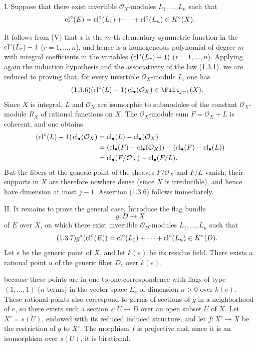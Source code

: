 I. Suppose that there exist invertible $\mathcal O_X$-modules
$L_1,\ldots,L_n$ such that
\[
\operatorname{cl}^\circ(E)=\operatorname{cl}^\circ(L_1)+\cdots+\operatorname{cl}^\circ(L_n)\in K^\circ(X).
\]

It follows from (V) that $x$ is the $m$-th elementary symmetric function in
the $\operatorname{cl}^\circ(L_r)-1$ ($r=1,\ldots,n$), and hence is a homogeneous
polynomial of degree $m$ with integral coefficients in the variables
$(\operatorname{cl}^\circ(L_r)-1)$ ($r=1,\ldots,n$). Applying again the induction
hypothesis and the associativity of the law (1.3.1), we are reduced to proving
that, for every invertible $\mathcal O_X$-module $L$, one has
\begin{equation}\tag{1.3.6}
(\cl^\circ(L)-1)\cl_\bullet(\mathcal O_X)\in\Filt_{j-1}(X).
\end{equation}
Since $X$ is integral, $L$ and $\mathcal O_X$ are isomorphic to submodules of
the constant $\mathcal O_X$-module $R_X$ of rational functions on $X$. The
$\mathcal O_X$-module sum $F=\mathcal O_X+L$ is coherent, and one obtains
\begin{align*}
(\operatorname{cl}^\circ(L)-1)\operatorname{cl}_\bullet(\mathcal O_X)
&=\operatorname{cl}_\bullet(L)-\operatorname{cl}_\bullet(\mathcal O_X)\\
&=(\operatorname{cl}_\bullet(F)-\operatorname{cl}_\bullet(\mathcal O_X))
  -(\operatorname{cl}_\bullet(F)-\operatorname{cl}_\bullet(L))\\
&=\operatorname{cl}_\bullet(F/\mathcal O_X)-\operatorname{cl}_\bullet(F/L).
\end{align*}
But the fibers at the generic point of the sheaves $F/\mathcal O_X$ and
$F/L$ vanish; their supports in $X$ are therefore nowhere dense (since $X$
is irreducible), and hence have dimension at most $j-1$. Assertion (1.3.6)
follows immediately.

II. It remains to prove the general case. Introduce the flag bundle
\[
g:D\longrightarrow X
\]
of $E$ over $X$, on which there exist invertible $\mathcal O_D$-modules
$L_1,\ldots,L_n$ such that
\begin{equation}\tag{1.3.7}
g^*(\operatorname{cl}^\circ(E))=\operatorname{cl}^\circ(L_1)+\cdots+\operatorname{cl}^\circ(L_n)\in K^\circ(D).
\end{equation}
Let $e$ be the generic point of $X$, and let $k(e)$ be its residue field.
There exists a rational point $u$ of the generic fiber $D_e$ over $k(e)$,

because these points are in one-to-one correspondence with flags of type
$(1,\ldots,1)$ ($n$ terms) in the vector space $E_e$ of dimension $n>0$ over
$k(e)$. These rational points also correspond to germs of sections of $g$ in
a neighborhood of $e$, so there exists such a section $s:U\to D$ over an
open subset $U$ of $X$. Let $X'=\overline{s(U)}$, endowed with its reduced
induced structure, and let $f:X'\to X$ be the restriction of $g$ to $X'$.
The morphism $f$ is projective and, since it is an isomorphism over $s(U)$,
it is birational.

